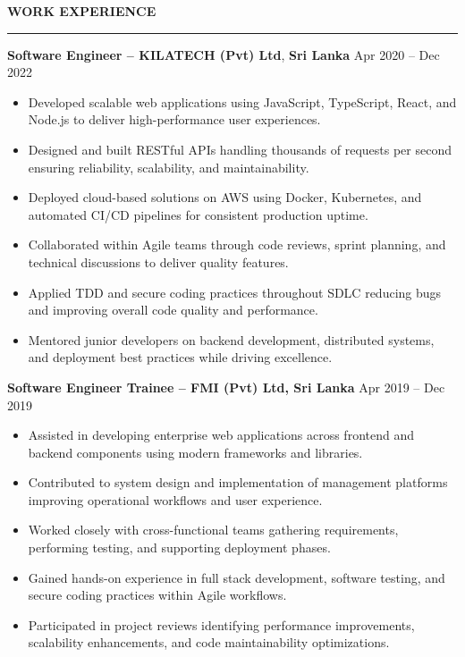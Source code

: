 \documentclass[10pt,letterpaper]{article}
\begin{document}
\vspace{8pt}

\textbf{WORK EXPERIENCE}\\[-8pt]
\noindent\rule{\textwidth}{1pt}

\vspace{-2pt}

\textbf{Software Engineer -- KILATECH (Pvt) Ltd}, \textbf{Sri Lanka} \hfill Apr 2020 -- Dec 2022

\vspace{-1pt}

\begin{itemize}
\item Developed scalable web applications using JavaScript, TypeScript, React, and Node.js to deliver high-performance user experiences.
\item Designed and built RESTful APIs handling thousands of requests per second ensuring reliability, scalability, and maintainability.
\item Deployed cloud-based solutions on AWS using Docker, Kubernetes, and automated CI/CD pipelines for consistent production uptime.
\item Collaborated within Agile teams through code reviews, sprint planning, and technical discussions to deliver quality features.
\item Applied TDD and secure coding practices throughout SDLC reducing bugs and improving overall code quality and performance.
\item Mentored junior developers on backend development, distributed systems, and deployment best practices while driving excellence.
\end{itemize}

\textbf{Software Engineer Trainee -- FMI (Pvt) Ltd, Sri Lanka} \hfill Apr 2019 -- Dec 2019

\vspace{-1pt}

\begin{itemize}
\item Assisted in developing enterprise web applications across frontend and backend components using modern frameworks and libraries.
\item Contributed to system design and implementation of management platforms improving operational workflows and user experience.
\item Worked closely with cross-functional teams gathering requirements, performing testing, and supporting deployment phases.
\item Gained hands-on experience in full stack development, software testing, and secure coding practices within Agile workflows.
\item Participated in project reviews identifying performance improvements, scalability enhancements, and code maintainability optimizations.
\end{itemize}
\end{document}
